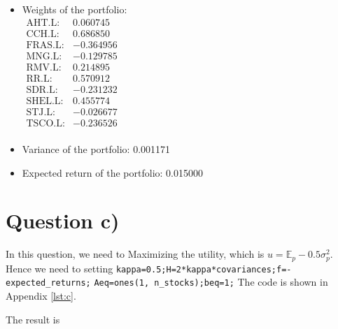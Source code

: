 \documentclass[12pt]{article}
\begin{document}
\begin{itemize}
    \item Weights of the portfolio: \\ \(
          \begin{array}{rr}
              \text{AHT.L:}  & 0.060745  \\
              \text{CCH.L:}  & 0.686850  \\
              \text{FRAS.L:} & -0.364956 \\
              \text{MNG.L:}  & -0.129785 \\
              \text{RMV.L:}  & 0.214895  \\
              \text{RR.L:}   & 0.570912  \\
              \text{SDR.L:}  & -0.231232 \\
              \text{SHEL.L:} & 0.455774  \\
              \text{STJ.L:}  & -0.026677 \\
              \text{TSCO.L:} & -0.236526 \\
          \end{array}
          \)
    \item Variance of the portfolio: 0.001171
    \item Expected return of the portfolio: 0.015000
\end{itemize}

\section{Question c)}

In this question, we need to Maximizing the utility, which is
\(u=\mathbb{E}_p-0.5 \sigma_p^2\).
Hence we need to setting
\verb|kappa=0.5;H=2*kappa*covariances;f=-expected_returns;|
\verb|Aeq=ones(1, n_stocks);beq=1;| The code is shown in Appendix \ref{lst:c}.

The result is
\end{document}
